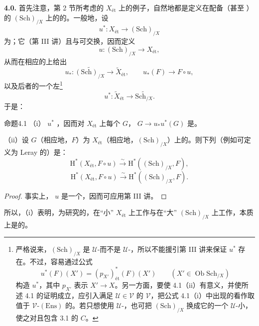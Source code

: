 \textbf{4.0.} 首先注意，第 2 节所考虑的 $X_{\text{ét}}$ 上的例子，自然地都是定义在配备（甚至 ）的 $(\mathrm{Sch})_{/X}$ 上的的。一般地，设
\[
 u^*:X_{\text{ét}}\longrightarrow(\mathrm{Sch})_{/X}
\]
为；它（第 III 讲）且与可交换，因而定义
\[
 u:(\mathrm{Sch})_{/X}\longrightarrow X_{\text{ét}},
\]
从而在相应的上给出
\[
 u_*:\widetilde{(\mathrm{Sch})_{/X}}\longrightarrow\widetilde X_{\text{ét}},
 \qquad u_*(F)\longrightarrow F\circ u,
\]
以及后者的一个左\footnote{严格说来，$(\mathrm{Sch})_{/X}$ 是 $\mathcal U$-而不是 $\mathcal U$-，所以不能援引第 III 讲来保证 $u^*$ 存在。不过，容易通过公式
\[
 u^*(F)(X')=(p_{X'})_{\text{ét}}^*(F)(X')\qquad
 (X'\in\operatorname{Ob}\mathrm{Sch}_{/X})
\]
构造 $u^*$，其中 $p_{X'}$ 表示 $X'\to X$。另一方面，要使 4.1（ii）有意义，并使所述 4.1 的证明成立，应引入满足 $\mathcal U\in\mathcal V$ 的 $\mathcal V$，把公式 4.1（i）中出现的看作取值于 $\mathcal V$-$(\mathrm{Ens})$ 的。若只想使用 $\mathcal U$-，也可把 $(\mathrm{Sch})_{/X}$ 换成它的一个 $\mathcal U$-小，使之对且包含 3.1 的 $C$。}
\[
 u^*:\widetilde X_{\text{ét}}\longrightarrow\widetilde{\mathrm{Sch}_{/X}}.
\]
于是：

\begin{SGAresult}{命题}{4.1}
（i） $u^*$ ，因而对 $X_{\text{ét}}$ 上每个 $G$， $G\to u_*u^*(G)$ 是。

（ii）设 $G$（相应地，$F$）为 $X_{\text{ét}}$（相应地，$(\mathrm{Sch})_{/X}$）上的。则下列（例如可定义为 Leray 的）是：
\[
 \mathrm H^*(X_{\text{ét}},F\circ u)\xrightarrow\sim\mathrm H^*((\mathrm{Sch})_{/X},F),
\]
\[
 \mathrm H^*(X_{\text{ét}},F\circ u)\xrightarrow\sim\mathrm H^*((\mathrm{Sch})_{/X},F).
\]
\end{SGAresult}
\begin{proof}
事实上， $u$ 是一个，因而可应用第 III 讲。
\end{proof}
所以，（i）表明，为研究的，在“小” $X_{\text{ét}}$ 上工作与在“大” $(\mathrm{Sch})_{/X}$ 上工作，本质上是的。

